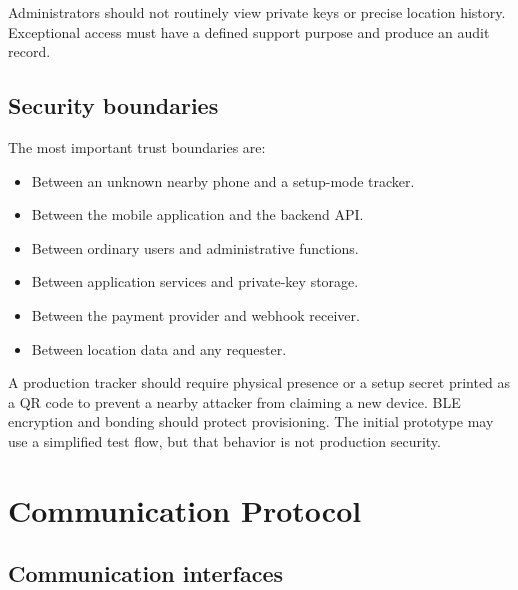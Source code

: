 \documentclass[12pt,a4paper]{article}
\begin{document}
Administrators should not routinely view private keys or precise location
history. Exceptional access must have a defined support purpose and produce an
audit record.

\subsection{Security boundaries}

The most important trust boundaries are:

\begin{itemize}
    \item Between an unknown nearby phone and a setup-mode tracker.
    \item Between the mobile application and the backend API.
    \item Between ordinary users and administrative functions.
    \item Between application services and private-key storage.
    \item Between the payment provider and webhook receiver.
    \item Between location data and any requester.
\end{itemize}

A production tracker should require physical presence or a setup secret printed
as a QR code to prevent a nearby attacker from claiming a new device. BLE
encryption and bonding should protect provisioning. The initial prototype may
use a simplified test flow, but that behavior is not production security.

\section{Communication Protocol}

\subsection{Communication interfaces}
\end{document}
